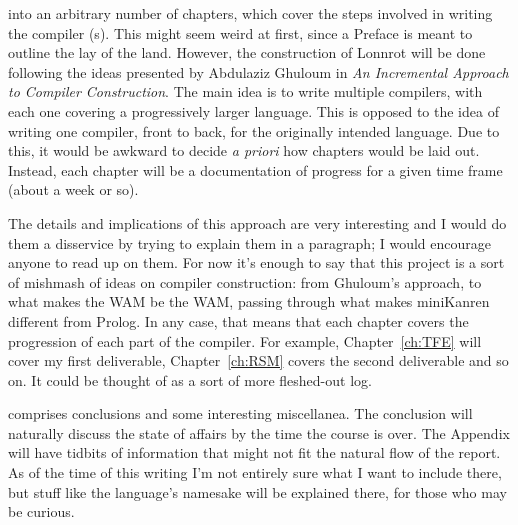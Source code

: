  into an arbitrary number of chapters, which cover the steps
involved in writing the compiler (s). This might seem weird at first, since a Preface is meant to outline
the lay of the land. However, the construction of Lonnrot will be done following the ideas presented
by Abdulaziz Ghuloum in \textit{An Incremental Approach to Compiler Construction}.
The main idea is to write multiple compilers, with each one covering a progressively larger language.
This is opposed to the idea of writing one compiler, front to back, for the originally intended
language. Due to this, it would be awkward to decide \textit{a priori} how chapters would be laid out.
Instead, each chapter will be a documentation of progress for a given time frame (about a week or so).

The details and implications of this approach are very interesting and I would
do them a disservice by trying to explain them in a paragraph; I would encourage anyone
to read up on them. For now it's enough to say that this project is a sort of mishmash of ideas
on compiler construction: from Ghuloum's approach, to what makes the WAM be the WAM, passing
through what makes miniKanren different from Prolog. In any case, that means that each chapter covers
the progression of each part of the compiler. For example, Chapter~\ref{ch:TFE} will cover my first
deliverable, Chapter~\ref{ch:RSM} covers the second deliverable and so on. It could
be thought of as a sort of more fleshed-out log.

 comprises conclusions and some interesting
miscellanea. The conclusion will naturally discuss the state of affairs by the time the course is over.
The Appendix will have tidbits of information that might not fit the natural flow of the report.
As of the time of this writing I'm not entirely sure what I want to include there, but
stuff like the language's namesake will be explained there, for those who may be curious.
